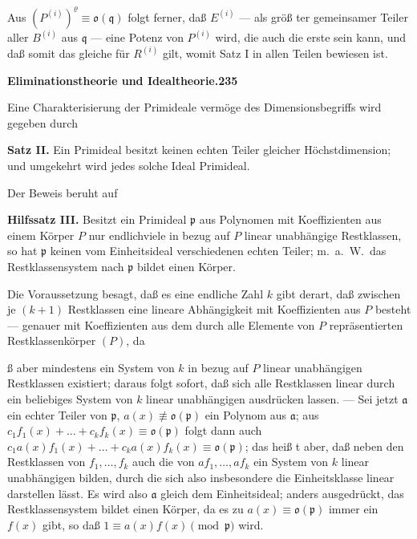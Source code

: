 \documentclass[12pt,a4paper]{article}
\begin{document}
{Aus $(P^{(i)})^{\varrho}\equiv\mathfrak{o}(\mathfrak{q})$ folgt ferner, da{\ss} $E^{(i)}$ --- als gr\"{o}{\ss} ter gemeinsamer Teiler
aller $B^{(i)}$ aus $\mathfrak{q}$ --- eine Potenz von $P^{(i)}$ wird, die auch die erste sein
kann, und da{\ss} somit das gleiche f\"{u}r $R^{(i)}$ gilt, womit Satz I in allen
Teilen bewiesen ist.

\newpage
\begin{center}
\textbf{Eliminationstheorie und Idealtheorie.}\quad\textbf{235}
\end{center}

Eine Charakterisierung der Primideale verm\"{o}ge des Dimensionsbegriffs
wird gegeben durch

\textbf{Satz II.} Ein Primideal besitzt keinen echten Teiler gleicher H\"{o}chstdimension;
und umgekehrt wird jedes solche Ideal Primideal.

Der Beweis beruht auf

\textbf{Hilfssatz III.} Besitzt ein Primideal $\mathfrak{p}$ aus Polynomen mit Koeffizienten
aus einem K\"{o}rper $P$ nur endlichviele in bezug auf $P$ linear unabh\"{a}ngige
Restklassen, so hat $\mathfrak{p}$ keinen vom Einheitsideal verschiedenen echten Teiler;
m.~a.~W.~das Restklassensystem nach $\mathfrak{p}$ bildet einen K\"{o}rper.

Die Voraussetzung besagt, da{\ss} es eine endliche Zahl $k$ gibt derart,
da{\ss} zwischen je $(k+1)$ Restklassen eine lineare Abh\"{a}ngigkeit mit
Koeffizienten aus $P$ besteht --- genauer mit Koeffizienten aus dem durch
alle Elemente von $P$ repr\"{a}sentierten Restklassenk\"{o}rper $(P)$, da{\ss{}
aber mindestens ein System von $k$ in bezug auf $P$ linear unabh\"{a}ngigen
Restklassen existiert; daraus folgt sofort, da{\ss} sich alle Restklassen linear
durch ein beliebiges System von $k$ linear unabh\"{a}ngigen ausdr\"{u}cken lassen.
--- Sei jetzt $\mathfrak{a}$ ein echter Teiler von $\mathfrak{p}$, $a(x)\not\equiv\mathfrak{o}(\mathfrak{p})$ ein Polynom
aus $\mathfrak{a}$; aus $c_{1}f_{1}(x)+\dots+c_{k}f_{k}(x)\equiv\mathfrak{o}(\mathfrak{p})$ folgt dann auch
$c_{1}a(x)f_{1}(x)+\dots+c_{k}a(x)f_{k}(x)\equiv\mathfrak{o}(\mathfrak{p})$; das hei{\ss} t aber, da{\ss} neben den
Restklassen von $f_{1},\dots,f_{k}$ auch die von $af_{1},\dots,af_{k}$ ein System von $k$ linear
unabh\"{a}ngigen bilden, durch die sich also insbesondere die Einheitsklasse
linear darstellen l\"{a}sst. Es wird also $\mathfrak{a}$ gleich dem Einheitsideal; anders
ausgedr\"{u}ckt, das Restklassensystem bildet einen K\"{o}rper, da es zu $a(x)\equiv\mathfrak{o}(\mathfrak{p})$
immer ein $f(x)$ gibt, so da{\ss} $1\equiv a(x)f(x)\pmod{\mathfrak{p}}$ wird.

}}
\end{document}
